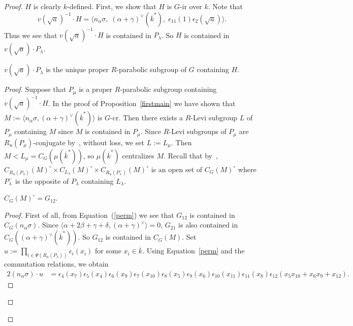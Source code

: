 \begin{proof}
$H$ is clearly $k$-defined. First, we show that $H$ is $G$-ir over $k$. Note that
\begin{equation*}
v(\sqrt a)^{-1}\cdot H = \langle n_\alpha \sigma, \; (\alpha+\gamma)^{\vee}(\overline k^*),\; \epsilon_{11}(1)\epsilon_{2}(\sqrt a)\rangle.
\end{equation*}
Thus we see that $v(\sqrt a)^{-1}\cdot H$ is contained in $P_\lambda$. So $H$ is contained in $v(\sqrt a)\cdot P_\lambda$. 

\begin{lem}\label{uniquepara}
$v(\sqrt a)\cdot P_\lambda$ is the unique proper $R$-parabolic subgroup of $G$ containing $H$.
\end{lem}
\begin{proof}
Suppose that $P_\mu$ is a proper $R$-parabolic subgroup containing $v(\sqrt a)^{-1}\cdot H$. In the proof of Proposition~\ref{firstmain} we have shown that $M:=\langle n_\alpha \sigma, (\alpha+\gamma)^{\vee}(\overline k^*)\rangle$ is $G$-cr. Then there exists a $R$-Levi subgroup $L$ of $P_\mu$ containing $M$ since $M$ is contained in $P_\mu$. Since $R$-Levi subgroups of $P_\mu$ are $R_u(P_\mu)$-conjugate by~\cite[Lem.~2.5()]{Bate-uniform-TransAMS}, without loss, we set $L:=L_\mu$. Then $M<L_\mu=C_G(\mu(\overline k^*))$, so $\mu(\overline k^*)$ centralizes $M$. Recall that by~\cite[Thm.~13.4.2]{Springer-book}, $C_{R_u(P_\lambda)}(M)^{\circ}\times C_{L_\lambda}(M)^{\circ}\times C_{R_u(P_\lambda^{-})}(M)^{\circ}$ is an open set of $C_G(M)^{\circ}$ where $P_\lambda^{-}$ is the opposite of $P_\lambda$ containing $L_\lambda$.  
\begin{lem}\label{centralizerofM}
$C_G(M)^{\circ}=G_{12}$.
\end{lem}
\begin{proof}
First of all, from Equation~(\ref{perm}) we see that $G_{12}$ is contained in $C_G(n_\alpha \sigma)$. Since $\langle \alpha+2\beta+\gamma+\delta, (\alpha+\gamma)^{\vee} \rangle=0$, $G_{21}$ is also contained in $C_G((\alpha+\gamma)^{\vee}(\overline k^*))$. So $G_{12}$ is contained in $C_G(M)$. Set $u:=\prod_{i\in \Psi(R_u(P_\lambda))}\epsilon_{i}(x_i)$ for some $x_i \in \overline k$. Using Equation~\ref{perm} and the commutation relations, we obtain
\begin{alignat*}{2}
(n_\alpha \sigma)\cdot u &= \epsilon_{4}(x_7)\epsilon_{5}(x_4)\epsilon_{6}(x_9)\epsilon_7(x_{10})\epsilon_8(x_{5})\epsilon_9(x_6)\epsilon_{10}(x_{11})\epsilon_{11}(x_8)\epsilon_{12}(x_5 x_{10}+x_6 x_9 +x_{12}). 
\end{alignat*}

\end{proof}
\end{proof}
\end{proof}
